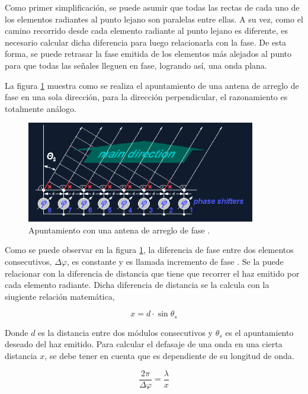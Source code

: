 Como primer simplificación, se puede asumir que todas las rectas de cada uno de los elementos radiantes al punto lejano son 
paralelas entre ellas. A su vez, como el camino recorrido desde cada elemento radiante al punto lejano es diferente, es 
necesario calcular dicha diferencia para luego relacionarla con la fase. De esta forma, se puede retrasar la fase emitida de 
los elementos más alejados al punto para que todas las señales lleguen en fase, logrando así, una onda plana.

La figura \ref{fig:beamSteering} muestra como se realiza el apuntamiento de una antena de arreglo de fase en una sola dirección,
para la dirección perpendicular, el razonamiento es totalmente análogo.

\begin{figure}[H]
 \centering
 \includegraphics[width=10cm]{gfx/beamSteering.png}
 \caption{Apuntamiento con una antena de arreglo de fase \cite{BeamSteering}.}
 \label{fig:beamSteering}
\end{figure}

Como se puede observar en la figura \ref{fig:beamSteering}, la diferencia de fase entre dos elementos consecutivos, 
$\Delta\varphi$, es constante y es llamada incremento de fase \cite{BeamSteering}. Se la puede relacionar con la diferencia 
de distancia que tiene que recorrer el haz emitido por cada elemento radiante. Dicha diferencia de distancia se la calcula con 
la siugiente relación matemática, 


\begin{equation}
	x = d\cdot \sin{\theta_s}
	\label{eq:steering}
\end{equation}

Donde $d$ es la distancia entre dos módulos consecutivos y $\theta_s$ es el apuntamiento deseado del haz emitido. Para calcular
el defasaje de una onda en una cierta distancia $x$, se debe tener en cuenta que es dependiente de su longitud de onda. 

\begin{equation}
	\dfrac{2\pi}{\Delta\varphi} = \dfrac{\lambda}{x}
	\label{eq:dist2angle}
\end{equation}

